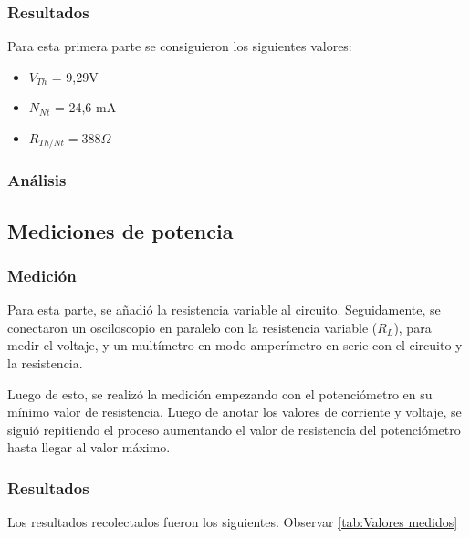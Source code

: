 \documentclass{article}
\begin{document}
            \subsubsection{Resultados}

                \quad Para esta primera parte se consiguieron los siguientes valores:
            	\begin{itemize}
                \item $V_{Th}$ = 9,29V
                \item $N_{Nt}$ = 24,6 mA
                \item $R_{Th/Nt} = 388  \Omega $
                \end{itemize}

            \subsubsection{Análisis}
        
        \subsection{Mediciones de potencia}

            \subsubsection{Medición}

            \quad Para esta parte, se añadió la resistencia variable al circuito. Seguidamente, se conectaron un osciloscopio en paralelo con la resistencia variable ($R_{L}$), para medir el voltaje, y un multímetro en modo amperímetro en serie con el circuito y la resistencia.\par
            Luego de esto, se realizó la medición empezando con el potenciómetro en su mínimo valor de resistencia. Luego de anotar los valores de corriente y voltaje, se siguió repitiendo el proceso aumentando el valor de resistencia del potenciómetro hasta llegar al valor máximo.\par
            

            \subsubsection{Resultados}
            
            \quad Los resultados recolectados fueron los siguientes. Observar \autoref{tab:Valores medidos}
\end{document}
